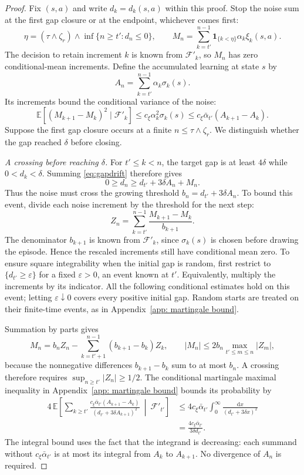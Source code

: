 \begin{proof}
Fix $(s,a)$ and write $d_k=d_k(s,a)$ within this proof. Stop the noise sum at the first gap closure or at the endpoint, whichever comes first:
\[
\eta=(\tau\wedge\zeta_r)\wedge\inf\{n\ge t':d_n\le0\},\qquad
M_n=\sum_{k=t'}^{n-1}\mathbf1_{\{k<\eta\}}\alpha_k\xi_k(s,a).
\]
The decision to retain increment $k$ is known from $\mathcal F'_k$, so $M_n$ has zero conditional-mean increments. Define the accumulated learning at state $s$ by
\begin{equation}\label{eq:clock}
A_n=\sum_{k=t'}^{n-1}\alpha_k\sigma_k(s).
\end{equation}
Its increments bound the conditional variance of the noise:
\[
\mathbb E[(M_{k+1}-M_k)^2\mid\mathcal F'_k]
\le c_\xi\alpha_k^2\sigma_k(s)
\le c_\xi\bar\alpha_{t'}(A_{k+1}-A_k).
\]
Suppose the first gap closure occurs at a finite $n\le\tau\wedge\zeta_r$. We distinguish whether the gap reached $\delta$ before closing.

\emph{A crossing before reaching $\delta$.} For $t'\le k<n$, the target gap is at least $4\delta$ while $0<d_k<\delta$. Summing \eqref{eq:gapdrift} therefore gives
\[
0\ge d_n\ge d_{t'}+3\delta A_n+M_n.
\]
Thus the noise must cross the growing threshold $b_n=d_{t'}+3\delta A_n$. To bound this event, divide each noise increment by the threshold for the next step:
\[
Z_n=\sum_{k=t'}^{n-1}\frac{M_{k+1}-M_k}{b_{k+1}}.
\]
The denominator $b_{k+1}$ is known from $\mathcal F'_k$, since $\sigma_k(s)$ is chosen before drawing the episode. Hence the rescaled increments still have conditional mean zero. To ensure square integrability when the initial gap is random, first restrict to $\{d_{t'}\ge\varepsilon\}$ for a fixed $\varepsilon>0$, an event known at $t'$. Equivalently, multiply the increments by its indicator. All the following conditional estimates hold on this event; letting $\varepsilon\downarrow0$ covers every positive initial gap. Random starts are treated on their finite-time events, as in Appendix~\ref{app: martingale bound}.

Summation by parts gives
\[
M_n=b_nZ_n-\sum_{k=t'+1}^{n-1}(b_{k+1}-b_k)Z_k,
\qquad
|M_n|\le2b_n\max_{t'\le m\le n}|Z_m|,
\]
because the nonnegative differences $b_{k+1}-b_k$ sum to at most $b_n$. A crossing therefore requires $\sup_{n\ge t'}|Z_n|\ge1/2$. The conditional martingale maximal inequality in Appendix~\ref{app: martingale bound} bounds its probability by
\begin{align*}
4\,\mathbb E\!\left[
\sum_{k\ge t'}\frac{c_\xi\bar\alpha_{t'}(A_{k+1}-A_k)}{(d_{t'}+3\delta A_{k+1})^2}
\ \middle|\ \mathcal F'_{t'}\right]
&\le4c_\xi\bar\alpha_{t'}\int_0^\infty\frac{\mathrm dx}{(d_{t'}+3\delta x)^2}\\
&=\frac{4c_\xi\bar\alpha_{t'}}{3\delta d_{t'}}.
\end{align*}
The integral bound uses the fact that the integrand is decreasing: each summand without $c_\xi\bar\alpha_{t'}$ is at most its integral from $A_k$ to $A_{k+1}$. No divergence of $A_n$ is required.


\end{proof}
